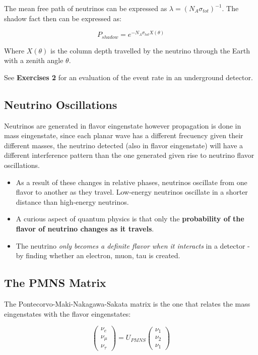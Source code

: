 \documentclass[
  letterpaper,
  DIV=11,
  numbers=noendperiod]{scrreprt}
\begin{document}
The mean free path of neutrinos can be expressed as
\(\lambda = (N_A \sigma_{tot})^{-1}\). The shadow fact then can be
expressed as:

\[P_{shadow} = e^{-N_A \sigma_{tot} X(\theta)}\]

Where \(X(\theta)\) is the column depth travelled by the neutrino
through the Earth with a zenith angle \(\theta\).

See \textbf{Exercises 2} for an evaluation of the event rate in an
underground detector.

\subsection*{Neutrino Oscillations}\label{neutrino-oscillations}

Neutrinos are generated in flavor eingenstate however propagation is
done in mass eingenstate, since each planar wave has a different
frecuency given their different masses, the neutrino detected (also in
flavor eingenstate) will have a different interference pattern than the
one generated given rise to neutrino flavor oscillations.

\begin{itemize}
\item
  As a result of these changes in relative phases, neutrinos oscillate
  from one flavor to another as they travel. Low-energy neutrinos
  oscillate in a shorter distance than high-energy neutrinos.
\item
  A curious aspect of quantum physics is that only the
  \textbf{probability of the flavor of neutrino changes as it travels}.
\item
  The neutrino \emph{only becomes a definite flavor when it interacts}
  in a detector - by finding whether an electron, muon, tau is created.
\end{itemize}

\subsection*{The PMNS Matrix}\label{the-pmns-matrix}

The Pontecorvo-Maki-Nakagawa-Sakata matrix is the one that relates the
mass eingenstates with the flavor eingenstates:

\[\begin{pmatrix} \nu_e \\ \nu_\mu \\ \nu_\tau \end{pmatrix} = U_{PMNS} \begin{pmatrix} \nu_1 \\ \nu_2 \\ \nu_1 \end{pmatrix}\]
\end{document}
